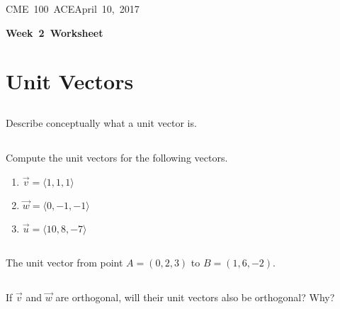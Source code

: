 \documentclass[letterpaper, 11pt]{article}
\makeatletter
\newcommand{\hmwkTitle}{Week\ 2\ Worksheet} %
\newcommand{\hmwkClass}{CME\ 100\ ACE} %
\newcommand{\hmwkAuthorName}{Timothy Anderson} %
\newcommand{\hmwkAuthorEmail}{timmya@stanford.edu} %
\makeatother
\begin{document}


\noindent
\normalsize 
\hmwkClass \hfill April\ 10,\ 2017\\

\begin{center} \Large \textbf{\hmwkTitle} \end{center}


\section{Unit Vectors}
\subsection{} Describe conceptually what a unit vector is. 

\subsection{} Compute the unit vectors for the following vectors.
\begin{enumerate}[label=(\alph*)]
\item $\vec v = \langle 1,1,1 \rangle$

\item $\vec w = \langle 0,-1,-1 \rangle$

\item $\vec u = \langle 10,8,-7 \rangle$

\end{enumerate}

\subsection{} The unit vector from point $A = (0,2,3)$ to $B = (1,6,-2)$.

\subsection{} If $\vec v$ and $\vec w$ are orthogonal, will their unit vectors also be orthogonal? Why? 
\end{document}
